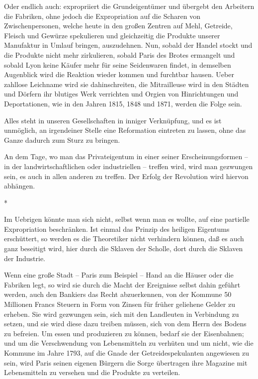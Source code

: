 \documentclass{scrbook}
\begin{document}
Oder endlich auch: expropriiert die Grundeigentümer und übergebt den Arbeitern die Fabriken, ohne jedoch die Expropriation auf die Scharen von Zwischenpersonen, welche heute in den großen Zentren auf Mehl, Getreide, Fleisch und Gewürze spekulieren und gleichzeitig die Produkte unserer Manufaktur in Umlauf bringen, auszudehnen. Nun, sobald der Handel stockt und die Produkte nicht mehr zirkulieren, sobald Paris des Brotes ermangelt und sobald Lyon keine Käufer mehr für seine Seidenwaren findet, in demselben Augenblick wird die Reaktion wieder kommen und furchtbar hausen. Ueber zahllose Leichname wird sie dahinschreiten, die Mitrailleuse wird in den Städten und Dörfern ihr blutiges Werk verrichten und Orgien von Hinrichtungen und Deportationen, wie in den Jahren 1815, 1848 und 1871, werden die Folge sein.

Alles steht in unseren Gesellschaften in inniger Verknüpfung, und es ist unmöglich, an irgendeiner Stelle eine Reformation eintreten zu lassen, ohne das Ganze dadurch zum Sturz zu bringen.

An dem Tage, wo man das Privateigentum in einer seiner Erscheinungsformen – in der landwirtschaftlichen oder industriellen – treffen wird, wird man gezwungen sein, es auch in allen anderen zu treffen. Der Erfolg der Revolution wird hiervon abhängen.

\begin{center}*\end{center}

Im Uebrigen könnte man sich nicht, selbst wenn man es wollte, auf eine partielle Expropriation beschränken. Ist einmal das Prinzip des heiligen Eigentums erschüttert, so werden es die Theoretiker nicht verhindern können, daß es auch ganz beseitigt wird, hier durch die Sklaven der Scholle, dort durch die Sklaven der Industrie.

Wenn eine große Stadt – Paris zum Beispiel – Hand an die Häuser oder die Fabriken legt, so wird sie durch die Macht der Ereignisse selbst dahin geführt werden, auch den Bankiers das Recht abzuerkennen, von der Kommune 50 Millionen Francs Steuern in Form von Zinsen für früher geliehene Gelder zu erheben. Sie wird gezwungen sein, sich mit den Landleuten in Verbindung zu setzen, und sie wird diese dazu treiben müssen, sich von dem Herrn des Bodens zu befreien. Um essen und produzieren zu können, bedarf sie der Eisenbahnen; und um die Verschwendung von Lebensmitteln zu verhüten und um nicht, wie die Kommune im Jahre 1793, auf die Gnade der Getreidespekulanten angewiesen zu sein, wird Paris seinen eigenen Bürgern die Sorge übertragen ihre Magazine mit Lebensmitteln zu versehen und die Produkte zu verteilen.
\end{document}
